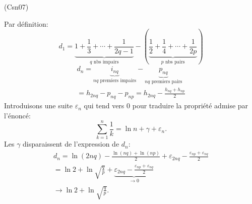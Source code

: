 \begin{tiny}(Csn07)\end{tiny} Par définition:
\[
 d_1 = \underset{q \text{ nbs impairs}}{\underbrace{1 + \frac{1}{3} + \cdots + \frac{1}{2q-1}}} 
 - \left(\underset{p\text{ nbs pairs}}{\underbrace{ \frac{1}{2} + \frac{1}{4} + \cdots + \frac{1}{2p}}}\right)  
\]
\begin{multline*}
 d_n = \underset{nq\text{ premiers impairs}}{\underbrace{i_{nq}}} 
 - \underset{nq\text{ premiers pairs}}{\underbrace{p_{nq}}}\\
 = h_{2nq} - p_{nq} - p_{np}
 = h_{2nq} - \frac{h_{nq} + h_{np}}{2}
\end{multline*}
Introduisons une suite $\varepsilon_n$ qui tend vers $0$ pour traduire la propriété admise par l'énoncé:
\[
 \sum_{k=1}^{n}\frac{1}{k} = \ln n + \gamma + \varepsilon_n.
\]
Les $\gamma$ disparaissent de l'expression de $d_n$:
\begin{multline*}
 d_n = \ln(2nq) - \frac{\ln(nq) + \ln(np)}{2} + \varepsilon_{2nq} - \frac{\varepsilon_{np} + \varepsilon_{nq}}{2}\\
 = \ln 2 + \ln \sqrt{\frac{q}{p}} + \underset{\rightarrow 0}{\underbrace{\varepsilon_{2nq} - \frac{\varepsilon_{np} + \varepsilon_{nq}}{2}}}\\
 \rightarrow \ln 2 + \ln \sqrt{\frac{q}{p}}.
\end{multline*}
